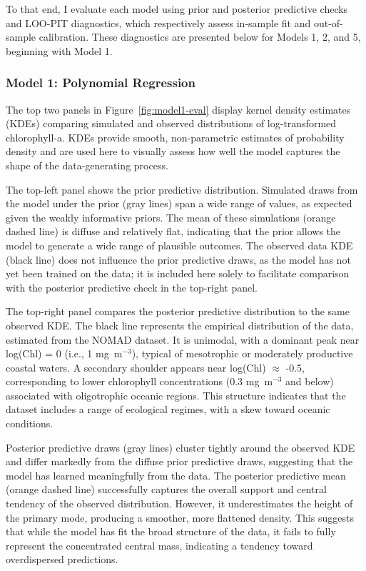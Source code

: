 \documentclass[preprint,authoryear]{elsarticle}
\begin{document}
To that end, I evaluate each model using prior and posterior predictive checks and LOO-PIT diagnostics, which respectively assess in-sample fit and out-of-sample calibration. These diagnostics are presented below for Models 1, 2, and 5, beginning with Model 1.

\subsubsection{Model 1: Polynomial Regression}

The top two panels in Figure~\ref{fig:model1-eval} display kernel density estimates (KDEs) comparing simulated and observed distributions of log-transformed chlorophyll-a. KDEs provide smooth, non-parametric estimates of probability density and are used here to visually assess how well the model captures the shape of the data-generating process.

The top-left panel shows the prior predictive distribution. Simulated draws from the model under the prior (gray lines) span a wide range of values, as expected given the weakly informative priors. The mean of these simulations (orange dashed line) is diffuse and relatively flat, indicating that the prior allows the model to generate a wide range of plausible outcomes. The observed data KDE (black line) does not influence the prior predictive draws, as the model has not yet been trained on the data; it is included here solely to facilitate comparison with the posterior predictive check in the top-right panel.

The top-right panel compares the posterior predictive distribution to the same observed KDE. The black line represents the empirical distribution of the data, estimated from the NOMAD dataset. It is unimodal, with a dominant peak near log(Chl) = 0 (i.e., 1 mg~m$^{-3}$), typical of mesotrophic or moderately productive coastal waters. A secondary shoulder appears near log(Chl) $\approx$ -0.5, corresponding to lower chlorophyll concentrations (0.3 mg~m$^{-3}$ and below) associated with oligotrophic oceanic regions. This structure indicates that the dataset includes a range of ecological regimes, with a skew toward oceanic conditions.

Posterior predictive draws (gray lines) cluster tightly around the observed KDE and differ markedly from the diffuse prior predictive draws, suggesting that the model has learned meaningfully from the data. The posterior predictive mean (orange dashed line) successfully captures the overall support and central tendency of the observed distribution. However, it underestimates the height of the primary mode, producing a smoother, more flattened density. This suggests that while the model has fit the broad structure of the data, it fails to fully represent the concentrated central mass, indicating a tendency toward overdispersed predictions.
\end{document}
